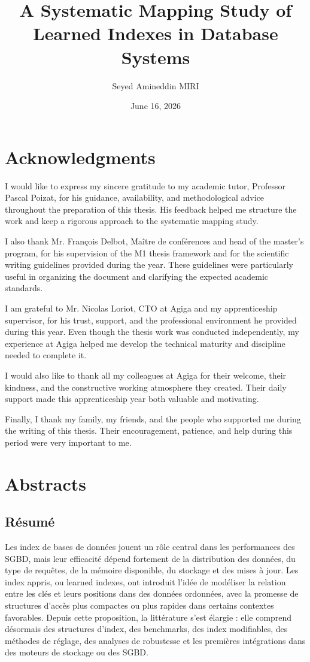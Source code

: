 \documentclass[a4paper, 12pt, twoside]{report}
\author{Seyed Amineddin MIRI}
\title{A Systematic Mapping Study of Learned Indexes in Database Systems}
\date{June 16, 2026}
\begin{document}
\pagedegarde

\chapter*{Acknowledgments}
I would like to express my sincere gratitude to my academic tutor, Professor Pascal Poizat, for his guidance, availability, and methodological advice throughout the preparation of this thesis. His feedback helped me structure the work and keep a rigorous approach to the systematic mapping study.

I also thank Mr. François Delbot, Maître de conférences and head of the master's program, for his supervision of the M1 thesis framework and for the scientific writing guidelines provided during the year. These guidelines were particularly useful in organizing the document and clarifying the expected academic standards.

I am grateful to Mr. Nicolas Loriot, CTO at Agiga and my apprenticeship supervisor, for his trust, support, and the professional environment he provided during this year. Even though the thesis work was conducted independently, my experience at Agiga helped me develop the technical maturity and discipline needed to complete it.

I would also like to thank all my colleagues at Agiga for their welcome, their kindness, and the constructive working atmosphere they created. Their daily support made this apprenticeship year both valuable and motivating.

Finally, I thank my family, my friends, and the people who supported me during the writing of this thesis. Their encouragement, patience, and help during this period were very important to me.

\chapter*{Abstracts}
\section*{Résumé}
Les index de bases de données jouent un rôle central dans les performances des SGBD, mais leur efficacité dépend fortement de la distribution des données, du type de requêtes, de la mémoire disponible, du stockage et des mises à jour. Les index appris, ou learned indexes, ont introduit l'idée de modéliser la relation entre les clés et leurs positions dans des données ordonnées, avec la promesse de structures d'accès plus compactes ou plus rapides dans certains contextes favorables. Depuis cette proposition, la littérature s'est élargie : elle comprend désormais des structures d'index, des benchmarks, des index modifiables, des méthodes de réglage, des analyses de robustesse et les premières intégrations dans des moteurs de stockage ou des SGBD.
\end{document}
